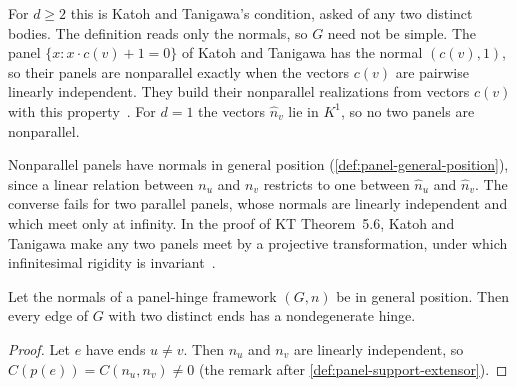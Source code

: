 For $d \ge 2$ this is Katoh and Tanigawa's condition, asked of any two
distinct bodies. The definition reads only the normals, so $G$ need not
be simple. The panel $\{x : x \cdot c(v) + 1 = 0\}$ of Katoh and
Tanigawa has the normal $(c(v), 1)$, so their panels are nonparallel
exactly when the vectors $c(v)$ are pairwise linearly independent. They
build their nonparallel realizations from vectors $c(v)$ with this
property~\cite[p.~668]{katohTanigawa2011}. For $d = 1$ the vectors
$\hat n_v$ lie in $K^1$, so no two panels are nonparallel.

Nonparallel panels have normals in general position
(\cref{def:panel-general-position}), since a linear relation between
$n_u$ and $n_v$ restricts to one between $\hat n_u$ and $\hat n_v$. The
converse fails for two parallel panels, whose normals are linearly
independent and which meet only at infinity. In the proof of KT
Theorem~5.6, Katoh and Tanigawa make any two panels meet by a projective
transformation, under which infinitesimal rigidity is
invariant~\cite[p.~670]{katohTanigawa2011}.

\begin{lemma}
  \label{lem:general-position-support-nonzero}
  \leanok
  Let the normals of a panel-hinge framework $(G, n)$ be in general
  position. Then every edge of $G$ with two distinct ends has a
  nondegenerate hinge.
\end{lemma}
\begin{proof}
  \leanok
  Let $e$ have ends $u \neq v$. Then $n_u$ and $n_v$ are linearly
  independent, so $C(p(e)) = C(n_u, n_v) \neq 0$ (the remark after
  \cref{def:panel-support-extensor}).
\end{proof}

